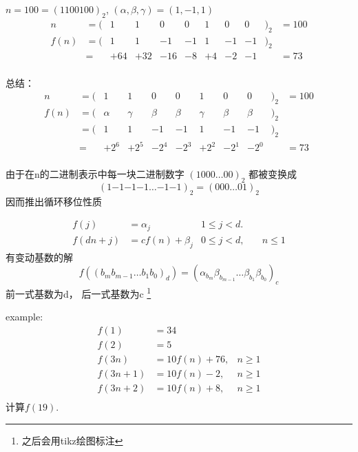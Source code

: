 \documentclass[mode=geye]{elegantnote}
\begin{document}
$ n = 100 = (1100100)_2 $, $ (\alpha, \beta, \gamma) = (1, -1, 1) $
\begin{equation*}
	\begin{array}{rlrrrrrrrll}
		n    &= ( &   1  &  1  &  0  &  0  &  1 &  0 &  0&)_2   &= 100  \\
		f(n) &= ( &   1  &  1  & -1  &  -1 &  1 & -1 & -1&)_2   &       \\
		     &=   & +64  & +32 & -16 &  -8 & +4 & -2 & -1&      &= 73   \\
	\end{array}
\end{equation*}

总结：
\begin{equation*}
	\begin{array}{rlrrrrrrrll}
		n    &= ( &   1     &  1       & 0     &  0     &  1      &  0    &  0    &)_2   &= 100  \\
		f(n) &= ( & \alpha  &  \gamma  & \beta &  \beta &  \gamma & \beta & \beta &)_2   &       \\
		     &= ( &   1     &  1       & -1    &  -1    &  1      & -1    & -1    &)_2   &       \\
		     &=   & +2^6    & +2^5     & -2^4  &  -2^3  & +2^2    & -2^1  & -2^0  &      &= 73   \\
	\end{array}
\end{equation*}

由于在n的二进制表示中每一块二进制数字 $ (1000\dots00)_{2} $ 都被变换成 
\begin{equation}\label{JnCurrBina}
	(1 {-1} {-1} {-1}\dots {-1} {-1})_{2} = (000\dots01)_{2}
\end{equation}
 因而推出循环移位性质

\begin{align*}
	f(j)    &= \alpha_{j}          & 1 \leqslant j < d. &                     \\
	f(dn+j) &= c f(n) + \beta_{j}  & 0 \leqslant j < d, &\quad n \leqslant 1  
\end{align*}
有变动基数的解
\begin{equation}\label{JnForDiffBase}
	f((b_m b_{m-1}\dots b_1 b_0)_{d}) = (\alpha_{b_{m}} \beta_{b_{m-1}}\dots \beta_{b_1} \beta_{b_0})_{c}
\end{equation}
前一式基数为d， 后一式基数为c \footnote{之后会用tikz绘图标注}


example:
\begin{align*}
	f(   1) &= 34              &               \\
	f(   2) &= 5               &               \\
	f(3n  ) &= 10f(n) + 76,    & n \geqslant 1 \\
	f(3n+1) &= 10f(n) -  2,    & n \geqslant 1 \\
	f(3n+2) &= 10f(n) +  8,    & n \geqslant 1 \\
\end{align*}
计算$ f(19) $.
\end{document}
